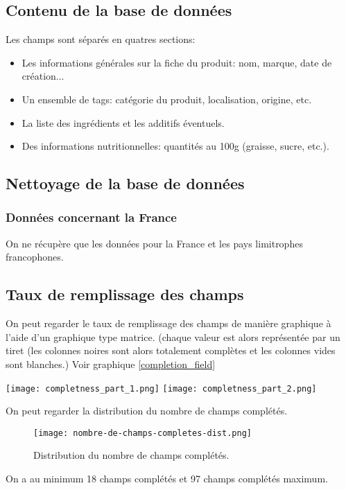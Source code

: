   \subsection{Contenu de la base de données}

  Les champs sont séparés en quatres sections:
  \begin{itemize}
    \item Les informations générales sur la fiche du produit: nom, marque, date de création...
    \item Un ensemble de tags: catégorie du produit, localisation, origine, etc.
    \item La liste des ingrédients et les additifs éventuels.
    \item Des informations nutritionnelles: quantités au 100g (graisse, sucre, etc.).
  \end{itemize}

  \subsection{Nettoyage de la base de données}

    \subsubsection{Données concernant la France}
    On ne récupère que les données pour la France et les pays limitrophes
    francophones.

    \subsection{Taux de remplissage des champs}

    On peut regarder le taux de remplissage des champs de manière graphique à
    l'aide d'un graphique type matrice. (chaque valeur est alors représentée
    par un tiret (les colonnes noires sont alors totalement complètes et les
    colonnes vides sont blanches.) Voir graphique \ref{completion_field}

    \begin{figure*}[b]
      \texttt{[image: completness\_part\_1.png]}
      \texttt{[image: completness\_part\_2.png]}
      \caption{Taux de remplissage des variables. En haut les colonnes de 1 à 78
      et en bas le reste des colonnes. Les colonnes vides ont été retirées}
      \label{completion_field}
    \end{figure*}

    On peut regarder la distribution du nombre de champs complétés.
    \begin{figure}[H]
      \texttt{[image: nombre-de-champs-completes-dist.png]}
      \caption{Distribution du nombre de champs complétés.}
      \label{distrib_completion}
    \end{figure}
    On a au minimum 18 champs complétés et 97 champs complétés maximum.

